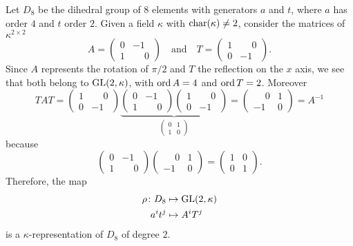 \begin{xmpl}
    Let $D_8$ be the dihedral group of $8$ elements with generators $a$ and $t$, where $a$ has order $4$ and $t$ order $2$. Given a field $\kappa$ with $\operatorname{char}(\kappa)\ne2$, consider the matrices of $\kappa^{2\times2}$
    $$
        A = \begin{pmatrix}
            0   &-1\\
            1   &\phantom-0
        \end{pmatrix}
        \quad\text{and}\quad
        T = \begin{pmatrix}
            1   &\phantom-0\\
            0   &-1
        \end{pmatrix}.
    $$
    Since $A$ represents the rotation of $\pi/2$ and $T$ the reflection on the $x$ axis, we see that both belong to $\operatorname{GL}(2,\kappa)$, with $\operatorname{ord} A=4$ and $\operatorname{ord} T=2$. Moreover
    $$
        TAT = \begin{pmatrix}
            1   &\phantom-0\\
            0   &-1
        \end{pmatrix}
        \underbrace{
        \begin{pmatrix}
            0   &-1\\
            1   &\phantom-0
        \end{pmatrix}
        \begin{pmatrix}
            1   &\phantom-0\\
            0   &-1
        \end{pmatrix}}_{ \begin{pmatrix}
            0   &1\\
            1   &0
        \end{pmatrix}}
        = \begin{pmatrix}
            \phantom-0    &1\\
            -1   &0
        \end{pmatrix}
        =A^{-1}
    $$
    because
    $$
        \begin{pmatrix}
            0   &-1\\
            1   &\phantom-0
        \end{pmatrix}
        \begin{pmatrix}
            \phantom-0    &1\\
            -1   &0
        \end{pmatrix}
        =
        \begin{pmatrix}
            1   &0\\
            0   &1
        \end{pmatrix}.
    $$
    Therefore, the map
    \begin{align*}
        \rho\colon D_8&\mapsto\operatorname{GL}(2,\kappa)\\
        a^it^j &\mapsto A^iT^j
    \end{align*}
    is a $\kappa$-representation of $D_8$ of degree $2$.


\end{xmpl}
